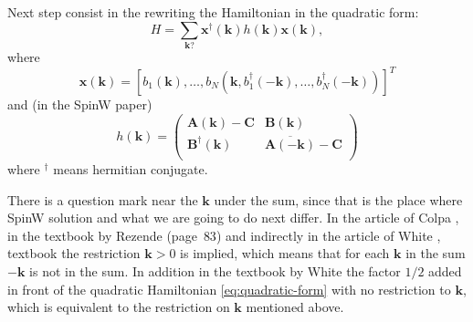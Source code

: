 \documentclass[a4paper,12pt]{article}
\begin{document}
        Next step consist in the rewriting the Hamiltonian in the quadratic form:
        \begin{equation}
            H = \sum_{\boldsymbol{k} ?} \boldsymbol{x}^{\dag}(\boldsymbol{k})h(\boldsymbol{k})\boldsymbol{x}(\boldsymbol{k}), \label{eq:quadratic-form}
        \end{equation}
        where
        \begin{equation}
            \boldsymbol{x}(\boldsymbol{k}) = \left[b_1(\boldsymbol{k}), \dots, b_N(\boldsymbol{k}, 
            b^{\dag}_1(-\boldsymbol{k}), \dots, b^{\dag}_N(-\boldsymbol{k}))\right]^T
        \end{equation}
        and (in the SpinW paper)
        \begin{equation}
            h(\boldsymbol{k}) = 
            \begin{pmatrix}
                \boldsymbol{A}(\boldsymbol{k}) - \boldsymbol{C} & \boldsymbol{B}(\boldsymbol{k}) \\
                \boldsymbol{B}^{\dag}(\boldsymbol{k}) &\overline{\boldsymbol{A}(-\boldsymbol{k})} - \boldsymbol{C} \\
            \end{pmatrix}
        \end{equation}
        where $^{\dag}$ means hermitian conjugate.
        
        There is a question mark near the $\boldsymbol{k}$ under the sum, since that is the place where SpinW solution and what we are going to do next differ.
        In the article of Colpa \cite{colpa1978diagonalization}, in the textbook by Rezende \cite{rezende2020fundamentals} (page~$83$) 
        and indirectly in the article of White \cite{white1965diagonalization}, textbook \cite{jensen1991rare} the restriction $\boldsymbol{k} > 0$ is implied, 
        which means that for each $\boldsymbol{k}$ in the sum $-\boldsymbol{k}$ is not in the sum. In addition in the textbook by White \cite{white1983quantum} 
        the factor $1/2$ added in front of the quadratic Hamiltonian \eqref{eq:quadratic-form} with no restriction to $\boldsymbol{k}$, 
        which is equivalent to the restriction on $\boldsymbol{k}$ mentioned above.
\end{document}
